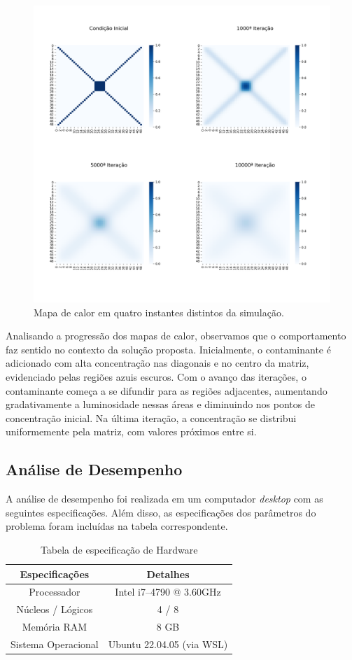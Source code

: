 \documentclass[12pt]{article}
\begin{document}
\begin{figure}[ht]
  \centering
  \includegraphics[width=.7\textwidth]{figs/heatmap.png}
  \caption{Mapa de calor em quatro instantes distintos da simulação.}
  \label{fig:heatmap}
\end{figure}

Analisando a progressão dos mapas de calor, observamos que o comportamento faz
sentido no contexto da solução proposta. Inicialmente, o contaminante é
adicionado com alta concentração nas diagonais e no centro da matriz,
evidenciado pelas regiões azuis escuros. Com o avanço das iterações, o
contaminante começa a se difundir para as regiões adjacentes, aumentando
gradativamente a luminosidade nessas áreas e diminuindo nos pontos de
concentração inicial. Na última iteração, a concentração se distribui
uniformemente pela matriz, com valores próximos entre si.

\subsection{Análise de Desempenho}

A análise de desempenho foi realizada em um computador \textit{desktop} com as
seguintes especificações. Além disso, as especificações dos parâmetros do
problema foram incluídas na tabela correspondente.

\begin{table}[ht]
  \centering
  \caption{Tabela de especificação de Hardware}
  \vspace{0.3cm}
  \begin{tabular}{||c c||}
    \hline
    Especificações      & Detalhes                  \\ [0.5ex]
    \hline\hline
    Processador         & Intel i7--4790 @ 3.60GHz   \\
    \hline
    Núcleos / Lógicos   & 4 / 8                     \\
    \hline
    Memória RAM         & 8 GB                      \\
    \hline
    Sistema Operacional & Ubuntu 22.04.05 (via WSL) \\
    \hline
  \end{tabular}
\end{table}
\end{document}
